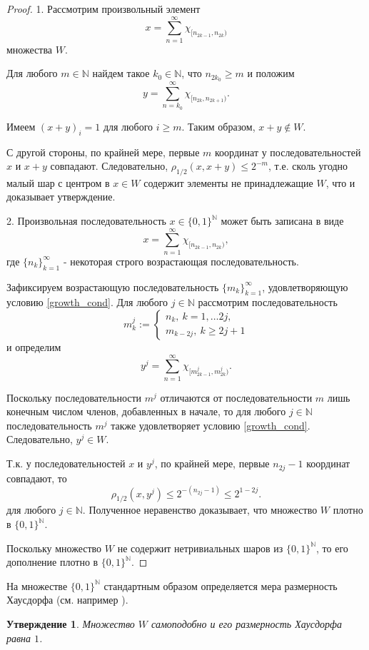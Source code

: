 \documentclass[12pt]{article}
\newtheorem{prop}[thm]{Утверждение}
\def\N{{\mathbb{N}}}
\begin{document}
\begin{proof}
1. Рассмотрим произвольный элемент
$$x=\sum_{n=1}^\infty \chi_{[n_{2k-1},n_{2k})}$$
множества $W$.

Для любого $m\in \N$ найдем такое $k_0\in\N$, что $n_{2k_0}\ge m$ и положим
$$y=\sum_{n=k_0}^\infty \chi_{[n_{2k},n_{2k+1})}.$$

Имеем $(x+y)_i=1$ для любого $i\ge m$. Таким образом, $x+y\notin W$.

С другой стороны, по крайней мере, первые $m$ координат у последовательностей $x$ и $x+y$ совпадают. Следовательно, $\rho_{1/2}(x,x+y)\le2^{-m}$, т.е. сколь угодно малый шар с центром в $x\in W$ содержит элементы не принадлежащие $W$, что и доказывает утверждение.

2. Произвольная последовательность $x\in\{0,1\}^\N$ может быть записана в виде
$$x=\sum_{n=1}^\infty \chi_{[n_{2k-1},n_{2k})},$$
где $\{n_k\}_{k=1}^\infty$ - некоторая строго возрастающая последовательность.

Зафиксируем возрастающую последовательность $\{m_k\}_{k=1}^\infty$, удовлетворяющую условию \eqref{growth_cond}. Для любого $j\in \N$ рассмотрим последовательность
$$m_k^j:=
\begin{cases}
n_k, \ k=1,\dots 2j,\\
m_{k-2j}, \ k\ge 2j+1
\end{cases}$$
и определим
$$y^j=\sum_{n=1}^\infty \chi_{[m^j_{2k-1},m^j_{2k})}.$$

Поскольку последовательности $m^j$ отличаются от последовательности $m$ лишь конечным числом членов, добавленных в начале, то для любого $j\in \N$ последовательность $m^j$ также удовлетворяет условию \eqref{growth_cond}. Следовательно, $y^j\in W$.

Т.к. у последовательностей $x$ и $y^j$, по крайней мере, первые $n_{2j}-1$ координат совпадают, то
$$\rho_{1/2}(x,y^j)\le2^{-(n_{2j}-1)}\le2^{1-2j}.$$
для любого $j\in \N$. Полученное неравенство доказывает, что множество $W$ плотно в $\{0,1\}^\N$.


Поскольку множество $W$ не содержит нетривиальных шаров из $\{0,1\}^\N$, то его дополнение плотно в $\{0,1\}^\N$.
\end{proof}

На множестве $\{0,1\}^\N$ стандартным образом определяется мера размерность Хаусдорфа (см. например \cite[Секция 6]{Edgar}).


\begin{prop}
Множество $W$ самоподобно и его размерность Хаусдорфа равна $1$.
\end{prop}
\end{document}
